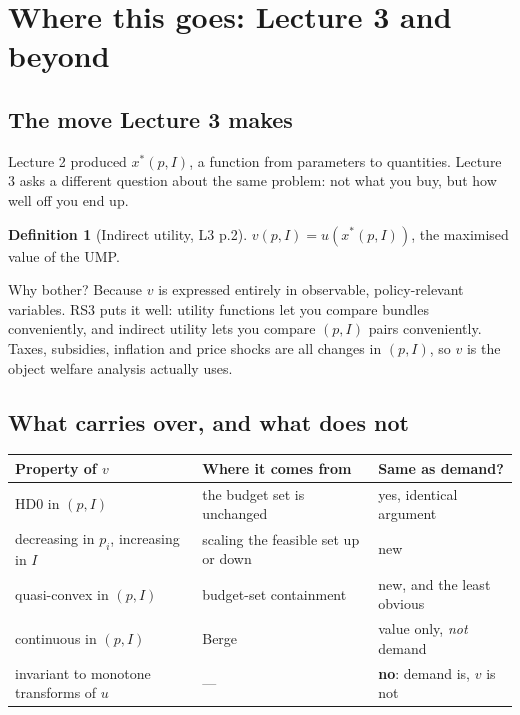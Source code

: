 \documentclass[11pt]{article}
\theoremstyle{definition}
\newtheorem{definition}{Definition}
\newcommand{\xs}{x^*}
\begin{document}
\clearpage

\section{Where this goes: Lecture 3 and beyond}

\subsection{The move Lecture 3 makes}

Lecture 2 produced $\xs(p,I)$, a function from parameters to quantities. Lecture 3 asks a
different question about the same problem: not what you buy, but how well off you end up.

\begin{definition}[Indirect utility, L3 p.2]
$v(p,I)=u(\xs(p,I))$, the maximised value of the UMP.
\end{definition}

Why bother? Because $v$ is expressed entirely in observable, policy-relevant variables. RS3
puts it well: utility functions let you compare bundles conveniently, and indirect utility
lets you compare $(p,I)$ pairs conveniently. Taxes, subsidies, inflation and price shocks
are all changes in $(p,I)$, so $v$ is the object welfare analysis actually uses.

\subsection{What carries over, and what does not}

\begin{center}
\begin{tabular}{@{}p{4.6cm}p{4.6cm}p{5.0cm}@{}}
\toprule
\textbf{Property of $v$} & \textbf{Where it comes from} & \textbf{Same as demand?} \\
\midrule
HD0 in $(p,I)$ & the budget set is unchanged & yes, identical argument \\[3pt]
decreasing in $p_i$, increasing in $I$ & scaling the feasible set up or down & new \\[3pt]
quasi-convex in $(p,I)$ & budget-set containment & new, and the least obvious \\[3pt]
continuous in $(p,I)$ & Berge & value only, \emph{not} demand \\[3pt]
invariant to monotone transforms of $u$ & --- & \textbf{no}: demand is, $v$ is not \\
\bottomrule
\end{tabular}
\end{center}
\end{document}
